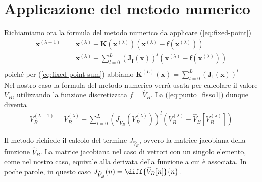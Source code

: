 	\section{Applicazione del metodo numerico}
		Richiamiamo ora la formula del metodo numerico da applicare (\ref{eq:fixed-point})
		\begin{equation}
			\label{eq:punto_fisso1}
			\begin{split}
				\mathbf{x}^{(\lambda+1)} &= \mathbf{x}^{(\lambda)}-\mathbf{K}(\mathbf{x}^{(\lambda)})(\mathbf{x}^{(\lambda)}-\mathbf{f}(\mathbf{x}^{(\lambda)}))\\
				&= \mathbf{x}^{(\lambda)}-\sum_{l=0}^{L} \left(\mathbf{J_{f}(x)}\right)^{l}(\mathbf{x}^{(\lambda)}-\mathbf{f}(\mathbf{x}^{(\lambda)}))\\
			\end{split}
		\end{equation}
		poiché per (\ref{eq:fixed-point-sum}) abbiamo $\mathbf{K}^{(L)}(\mathbf{x}) = \sum_{l=0}^{L} \left(\mathbf{J_{f}(x)}\right)^{l}$\\
		
		Nel nostro caso la formula del metodo numerico verrà usata per calcolare il valore $V_{B}$, utilizzando la funzione discretizzata $f = \widehat V_{B}$. La (\ref{eq:punto_fisso1}) dunque diventa
		\begin{equation}
			\label{eq:punto_fisso2}
			\begin{split}
				V_{B}^{(\lambda+1)} = V_{B}^{(\lambda)}-\sum_{l=0}^{L} \left(J_{\widehat V_{B}}(V_{B}^{(\lambda)})\right)^{l}(V_{B}^{(\lambda)}-\widehat V_{B}[V_{B}^{(\lambda)}])
			\end{split}
		\end{equation}
		
		Il metodo richiede il calcolo del termine $J_{\widehat V_{B}}$, ovvero la matrice jacobiana della funzione $\widehat V_{B}$. La matrice jacobiana nel caso di vettori con un singolo elemento, come nel nostro caso, equivale alla derivata della funzione a cui è associata. In poche parole, in questo caso $J_{\widehat V_{B}}(n) = \diff{\widehat V_{B}[n]}{n}$.\\
		
